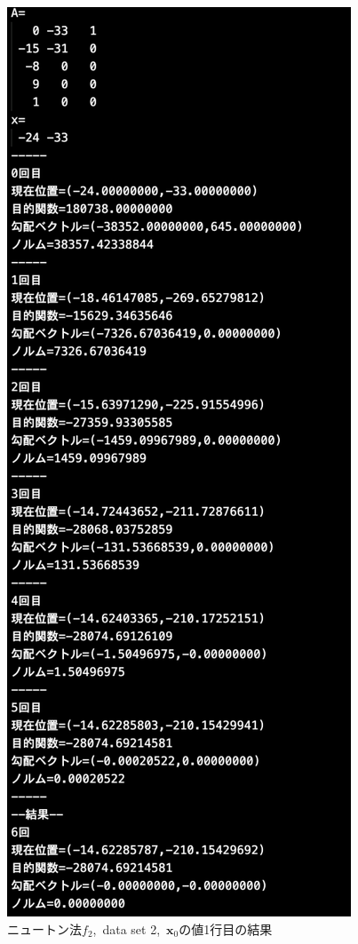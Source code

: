 \documentclass[12pt]{jarticle}
\begin{document}
\begin{figure}[h]
    \begin{center}
        \includegraphics[scale=0.2]{kadai1_2n_out2_1_1.png}
    \end{center}
    \caption{ニュートン法$f_2$,\ data set 2,\ $\boldsymbol{x}_0$の値1行目の結果}
\end{figure}
\end{document}
